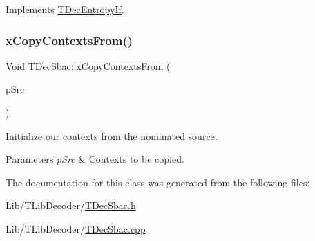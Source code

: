 Implements \hyperlink{class_t_dec_entropy_if}{T\+Dec\+Entropy\+If}.

\mbox{\label{class_t_dec_sbac_aebfb4f8804bc2fab34b35bdd56a7480a}} 
\subsubsection{\texorpdfstring{x\+Copy\+Contexts\+From()}{xCopyContextsFrom()}}
{\footnotesize\ttfamily Void T\+Dec\+Sbac\+::x\+Copy\+Contexts\+From (\begin{DoxyParamCaption}\item[{const \hyperlink{class_t_dec_sbac}{T\+Dec\+Sbac} $\ast$}]{p\+Src }\end{DoxyParamCaption})}


\begin{DoxyItemize}
\item Initialize our contexts from the nominated source.
\end{DoxyItemize}
\begin{DoxyParams}{Parameters}
{\em p\+Src} & Contexts to be copied. \\
\hline
\end{DoxyParams}


The documentation for this class was generated from the following files\+:\begin{DoxyCompactItemize}
\item 
Lib/\+T\+Lib\+Decoder/\hyperlink{_t_dec_sbac_8h}{T\+Dec\+Sbac.\+h}\item 
Lib/\+T\+Lib\+Decoder/\hyperlink{_t_dec_sbac_8cpp}{T\+Dec\+Sbac.\+cpp}\end{DoxyCompactItemize}
